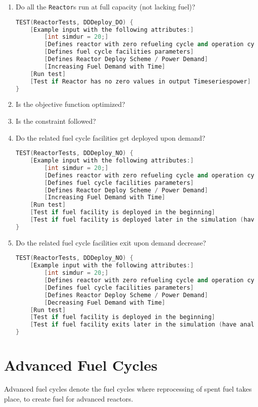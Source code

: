 \documentclass[12pt,letterpaper]{article}
\begin{document}
\begin{enumerate}
\item  Do all the \texttt{Reactor}s run at full capacity (not lacking fuel)? 
\begin{lstlisting}[language=C++, caption=Test to see all reactors run without lack of fuel]
TEST(ReactorTests, DDDeploy_DO) {
    [Example input with the following attributes:]
        [int simdur = 20;]
        [Defines reactor with zero refueling cycle and operation cycle of 1 month]
        [Defines fuel cycle facilities parameters]
        [Defines Reactor Deploy Scheme / Power Demand]
        [Increasing Fuel Demand with Time]
    [Run test]
    [Test if Reactor has no zero values in output Timeseriespower]
}
\end{lstlisting}

\item Is the objective function optimized?

\item Is the constraint followed? 

\item  Do the related fuel cycle facilities get deployed upon demand?
\begin{lstlisting}[language=C++, caption=Test demand-driven deployment of fuel cycle facility]
TEST(ReactorTests, DDDeploy_NO) {
    [Example input with the following attributes:]
        [int simdur = 20;]
        [Defines reactor with zero refueling cycle and operation cycle of 1 month]
        [Defines fuel cycle facilities parameters]
        [Defines Reactor Deploy Scheme / Power Demand]
        [Increasing Fuel Demand with Time]
    [Run test]
    [Test if fuel facility is deployed in the beginning]
    [Test if fuel facility is deployed later in the simulation (have analytic solution)]
}
\end{lstlisting}

\item Do the related fuel cycle facilities exit upon demand decrease?
\begin{lstlisting}[language=C++, caption=Test demand-driven exit of fuel cycle facility]
TEST(ReactorTests, DDDeploy_NO) {
    [Example input with the following attributes:]
        [int simdur = 20;]
        [Defines reactor with zero refueling cycle and operation cycle of 1 month]
        [Defines fuel cycle facilities parameters]
        [Defines Reactor Deploy Scheme / Power Demand]
        [Decreasing Fuel Demand with Time]
    [Run test]
    [Test if fuel facility is deployed in the beginning]
    [Test if fuel facility exits later in the simulation (have analytic solution)]
}
\end{lstlisting}


\end{enumerate}





\section{Advanced Fuel Cycles}
Advanced fuel cycles denote the fuel cycles
where reprocessing of spent fuel takes place,
to create fuel for advanced reactors. 
\end{document}
